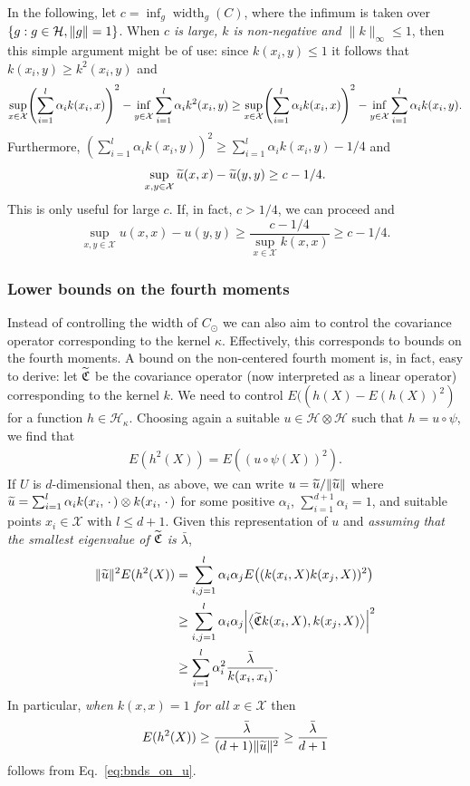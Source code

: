 \documentclass[AHL,Unicode,longabstracts,published]{cedram}
\theoremstyle{remark}
\DeclareMathOperator*{\infd}{inf\vphantom{p}}
\DeclareMathOperator{\diam}{width}
\newcommand{\X}{\mathcal{X}}
\newcommand{\cH}{\mathcal{H}}
\newcommand{\fkC}{\mathfrak{C}}
\let\oldtilde\tilde
\renewcommand*{\tilde}[1]{\mathchoice{\widetilde{#1}}{\widetilde{#1}}{\oldtilde{#1}}{\oldtilde{#1}}}
\let\originalleft\left
\let\originalright\right
\renewcommand{\left}{\mathopen{}\mathclose\bgroup\originalleft}
\renewcommand{\right}{\aftergroup\egroup\originalright}
\begin{document}
In the following, let $c = \inf_g \diam_g(C)$, where the infimum is taken over $\{g : g\in \cH,\linebreak \|g\|=1\}$. When \emph{$c$ is large, $k$ is non-negative and $\|k\|_\infty \leq 1$}, then this simple argument might be of use: since $k(x_i,y) \leq 1$ it follows that $k(x_i,y) \geq k^2(x_i,y)$ and
\[
\sup_{x \in \X} \left( \sum_{i=1}^{l} \alpha_i k(x_i,x) \right)^2 - \infd_{y \in \X} \sum_{i=1}^{l} \alpha_i k^2(x_i,y) \geq \sup_{x \in \X} \left(\sum_{i=1}^{l} \alpha_i k(x_i,x) \right)^2 - \infd_{y \in \X} \sum_{i=1}^{l} \alpha_i k(x_i,y).
\]
Furthermore, $(\sum_{i=1}^{l} \alpha_i k(x_i,y))^2 \geq \sum_{i=1}^{l} \alpha_i k(x_i,y) - 1/4$ and
\[
\sup_{x,y \in \X} \tilde u(x,x) - \tilde u(y,y) \geq c - 1/4.
\]
This is only useful for large $c$. If, in fact, $c > 1/4$, we can proceed and
\[
\sup_{x,y \in \X} u(x,x) - u(y,y) \geq \frac{c - 1/4}{\sup_{x \in \X} k(x,x)} \geq c - 1/4.
\]


\subsubsection{Lower bounds on the fourth moments}

Instead of controlling the width of $C_\odot$ we can also aim to control the covariance operator corresponding to the kernel $\kappa$. Effectively, this corresponds to bounds on the fourth moments. A bound on the non-centered fourth moment is, in fact, easy to derive: let $\tilde{\fkC}$ be the covariance operator (now interpreted as a linear operator) corresponding to the kernel $k$. We need to control $E((h(X) - E(h(X))^2)$ for a function $h \in \cH_\kappa$. Choosing again a suitable $u \in \cH \otimes \cH$ such that $h = u \circ \psi$, we find that
\begin{align*}
E(h^2(X)) = E((u \circ \psi(X))^2).
\end{align*}
If $U$ is $d$-dimensional then, as above, we can write $u = \tilde u/\|\tilde u\|$ where $\tilde u =\linebreak \sum_{i=1}^{l} \alpha_i k(x_i,\,\cdot\,) \otimes k(x_i,\,\cdot\,)$ for some positive $\alpha_i$, $\sum_{i=1}^{d+1} \alpha_i =1$, and suitable points $x_i \in \X$ with $l\leq d+1$. Given this representation of $u$ and \emph{assuming that the smallest eigenvalue of $\tilde{\fkC}$ is $\bar \lambda$},
\begin{align*}
\|\tilde u\|^2 E(h^2(X)) &= \sum_{i,j=1}^{l}\alpha_i \alpha_j E\bigl((k(x_i,X)k(x_j,X))^2\bigr)\\
&\geq \sum_{i,j=1}^{l}\alpha_i \alpha_j \left|\bigl\langle \tilde{\fkC} k(x_i,X),k(x_j,X) \bigr\rangle\right|^2 \\
&\geq \sum_{i=1}^{l} \alpha_i^2 \frac{\bar \lambda}{k(x_i,x_i)}.
\end{align*}
In particular, \emph{when $k(x,x) = 1$ for all $x \in \X$} then
\[
E(h^2(X)) \geq \frac{\bar \lambda}{(d+1) \|\tilde u\|^2} \geq \frac{\bar \lambda}{d+1}
\]
follows from Eq.~\eqref{eq:bnds_on_u}.
\end{document}
